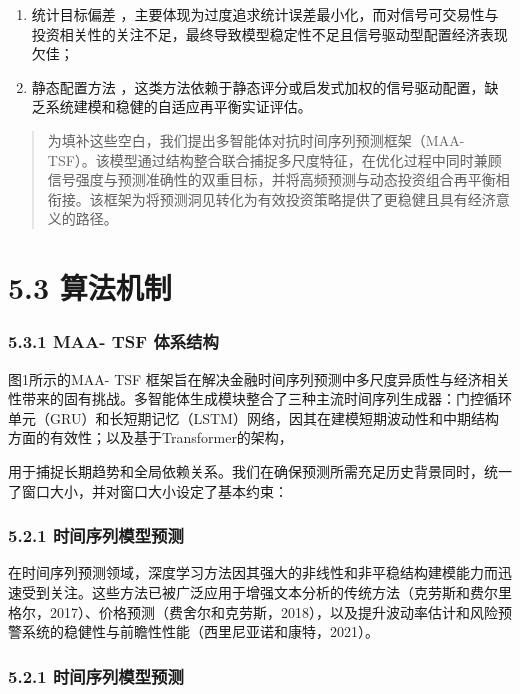 \documentclass[UTF8]{ctexart}
\begin{document}
\begin{enumerate}
\def\labelenumi{\arabic{enumi}.}
\setcounter{enumi}{1}
\item
  统计目标偏差
  ，主要体现为过度追求统计误差最小化，而对信号可交易性与投资相关性的关注不足，最终导致模型稳定性不足且信号驱动型配置经济表现欠佳；
\item
  静态配置方法
  ，这类方法依赖于静态评分或启发式加权的信号驱动配置，缺乏系统建模和稳健的自适应再平衡实证评估。
\end{enumerate}

\begin{quote}
为填补这些空白，我们提出多智能体对抗时间序列预测框架（MAA-
TSF）。该模型通过结构整合联合捕捉多尺度特征，在优化过程中同时兼顾信号强度与预测准确性的双重目标，并将高频预测与动态投资组合再平衡相衔接。该框架为将预测洞见转化为有效投资策略提供了更稳健且具有经济意义的路径。
\end{quote}

\section{5.3 算法机制}\label{ux7b97ux6cd5ux673aux5236-1}

\subsubsection{5.3.1 MAA- TSF
体系结构}\label{maa--tsf-ux4f53ux7cfbux7ed3ux6784}

图1所示的MAA- TSF
框架旨在解决金融时间序列预测中多尺度异质性与经济相关性带来的固有挑战。多智能体生成模块整合了三种主流时间序列生成器：门控循环单元（GRU）和长短期记忆（LSTM）网络，因其在建模短期波动性和中期结构方面的有效性；以及基于Transformer的架构，

用于捕捉长期趋势和全局依赖关系。我们在确保预测所需充足历史背景同时，统一了窗口大小，并对窗口大小设定了基本约束：

\subsubsection{5.2.1
时间序列模型预测}\label{ux65f6ux95f4ux5e8fux5217ux6a21ux578bux9884ux6d4b-1}

在时间序列预测领域，深度学习方法因其强大的非线性和非平稳结构建模能力而迅速受到关注。这些方法已被广泛应用于增强文本分析的传统方法（克劳斯和费尔里格尔，2017）、价格预测（费舍尔和克劳斯，2018），以及提升波动率估计和风险预警系统的稳健性与前瞻性性能（西里尼亚诺和康特，2021）。

\subsubsection{5.2.1
时间序列模型预测}\label{ux65f6ux95f4ux5e8fux5217ux6a21ux578bux9884ux6d4b-2}
\end{document}
